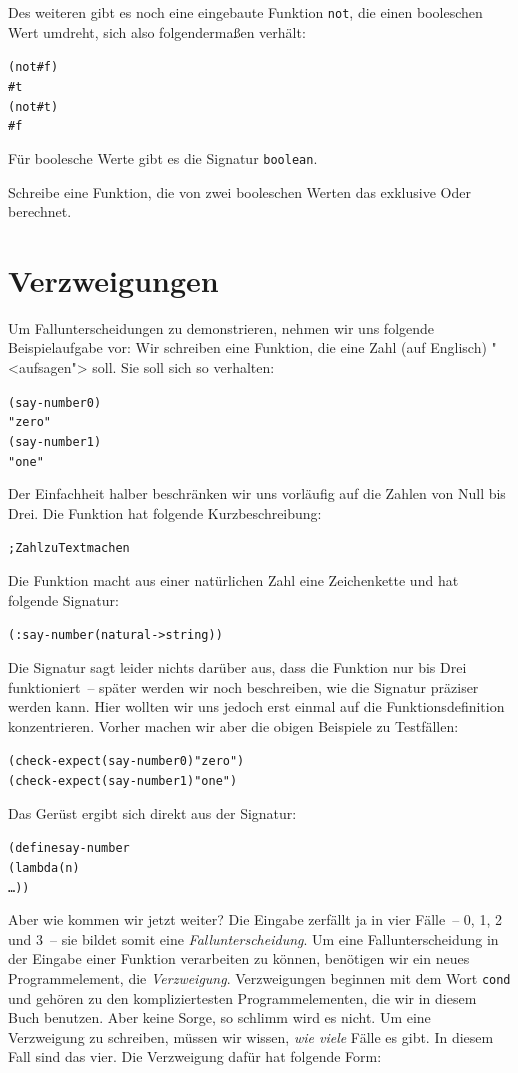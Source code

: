 Des weiteren gibt es noch eine eingebaute Funktion
\texttt{not}, die einen booleschen Wert
umdreht, sich also folgendermaßen verhält:
%
\begin{alltt}
(not #f)
\evalsto{} #t
(not #t)
\evalsto{} #f
\end{alltt}
%
Für boolesche Werte gibt es die Signatur
\texttt{boolean}.

\begin{aufgabe}
  Schreibe eine Funktion, die von zwei booleschen Werten das exklusive
  Oder berechnet. 
\end{aufgabe}

\section{Verzweigungen}

Um Fallunterscheidungen zu demonstrieren, nehmen wir uns folgende
Beispielaufgabe vor: Wir schreiben eine Funktion, die eine Zahl (auf
Englisch) "<aufsagen"> soll.  Sie soll sich so verhalten:
%
\begin{alltt}
(say-number 0)
\evalsto{} "zero"
(say-number 1)
\evalsto{} "one"
\end{alltt}
%
Der Einfachheit halber beschränken wir uns vorläufig auf die Zahlen
von Null bis Drei.  Die Funktion hat folgende Kurzbeschreibung:
%
\begin{alltt}
; Zahl zu Text machen
\end{alltt}
%
Die Funktion macht aus einer natürlichen Zahl eine Zeichenkette und
hat folgende Signatur:
%
\begin{alltt}
(: say-number (natural -> string))
\end{alltt}
%
Die Signatur sagt leider nichts darüber aus, dass die Funktion nur bis
Drei funktioniert~-- später werden wir noch beschreiben, wie die
Signatur präziser werden kann.  Hier wollten wir uns jedoch erst
einmal auf die Funktionsdefinition konzentrieren.  Vorher machen wir
aber die obigen Beispiele zu Testfällen:
%
\begin{alltt}
(check-expect (say-number 0) "zero")
(check-expect (say-number 1) "one")
\end{alltt}
%
Das Gerüst ergibt sich direkt aus der Signatur:
%
\begin{alltt}
(define say-number
  (lambda (n)
    \ldots))
\end{alltt}
%
Aber wie kommen wir jetzt weiter?  Die Eingabe zerfällt ja in vier
Fälle~-- 0, 1, 2 und 3~-- sie bildet somit eine
\textit{Fallunterscheidung}.  Um eine
Fallunterscheidung in der Eingabe einer Funktion verarbeiten zu können,
benötigen wir ein neues Programmelement, die
\textit{Verzweigung}.  Verzweigungen beginnen mit
dem Wort \texttt{cond} und gehören zu den kompliziertesten
Programmelementen, die wir in diesem Buch benutzen.  Aber keine Sorge,
so schlimm wird es nicht.  Um eine Verzweigung zu schreiben, müssen
wir wissen, \emph{wie viele} Fälle es gibt.  In diesem Fall sind das
vier.  Die Verzweigung dafür hat folgende Form:
%

